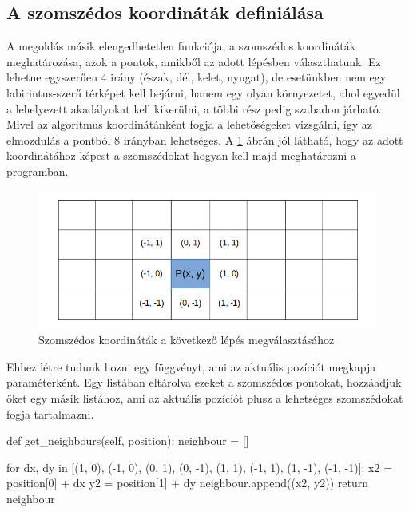 \subsection{A szomszédos koordináták definiálása}

A megoldás másik elengedhetetlen funkciója, a szomszédos koordináták meghatározása, azok a pontok, amikből az adott lépésben választhatunk. Ez lehetne egyszerűen 4 irány (észak, dél, kelet, nyugat), de esetünkben nem egy labirintus-szerű térképet kell bejárni, hanem egy olyan környezetet, ahol egyedül a lehelyezett akadályokat kell kikerülni, a többi rész pedig szabadon járható. Mivel az algoritmus koordinátánként fogja a lehetőségeket vizsgálni, így az elmozdulás a pontból 8 irányban lehetséges. A \ref{fig:neighbours} ábrán jól látható, hogy az adott koordinátához képest a szomszédokat hogyan kell majd meghatározni a programban.

\begin{figure}[h!]
\centering
\includegraphics[scale=0.60]{images/neighbours.png}
\caption{Szomszédos koordináták a következő lépés megválasztásához}
\label{fig:neighbours}
\end{figure}

\newpage

Ehhez létre tudunk hozni egy függvényt, ami az aktuális pozíciót megkapja paraméterként. Egy listában eltárolva ezeket a szomszédos pontokat, hozzáadjuk őket egy másik listához, ami az aktuális pozíciót plusz a lehetséges szomszédokat fogja tartalmazni. 

\begin{python}
	def get_neighbours(self, position):
        neighbour = []

        for dx, dy in [(1, 0), (-1, 0), (0, 1), (0, -1),
                       (1, 1), (-1, 1), (1, -1), (-1, -1)]:
            x2 = position[0] + dx
            y2 = position[1] + dy
            neighbour.append((x2, y2))
        return neighbour 
\end{python}

